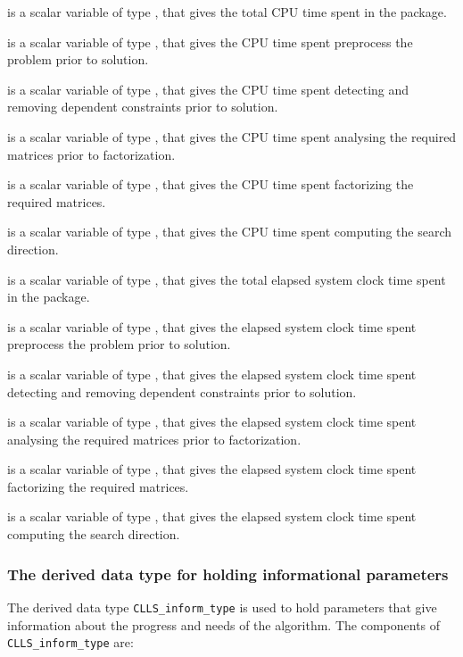 \documentclass{galahad}
\newcommand{\packagename}{CLLS}
\begin{document}
\begin{description}
 is a scalar variable of type \realdp, that gives
 the total CPU time spent in the package.

 is a scalar variable of type \realdp, that gives
 the CPU time spent preprocess the problem prior to solution.

 is a scalar variable of type \realdp, that gives
 the CPU time spent detecting and removing dependent constraints prior
to solution.

 is a scalar variable of type \realdp, that gives
 the CPU time spent analysing the required matrices prior to factorization.

 is a scalar variable of type \realdp, that gives
 the CPU time spent factorizing the required matrices.

 is a scalar variable of type \realdp, that gives
 the CPU time spent computing the search direction.

 is a scalar variable of type \realdp, that gives
 the total elapsed system clock time spent in the package.

 is a scalar variable of type \realdp, that gives
 the elapsed system clock time spent preprocess the problem prior to solution.

 is a scalar variable of type \realdp,
that gives  the elapsed system clock time spent detecting and removing
dependent constraints prior to solution.

 is a scalar variable of type \realdp, that gives
 the elapsed system clock time spent analysing the required matrices prior to
factorization.

 is a scalar variable of type \realdp, that gives
 the elapsed system clock time spent factorizing the required matrices.

 is a scalar variable of type \realdp, that gives
 the elapsed system clock time spent computing the search direction.

\end{description}


\subsubsection{The derived data type for holding informational
 parameters}\label{typeinform}
The derived data type
{\tt \packagename\_inform\_type}
is used to hold parameters that give information about the progress and needs
of the algorithm. The components of
{\tt \packagename\_inform\_type}
are:
\end{document}
